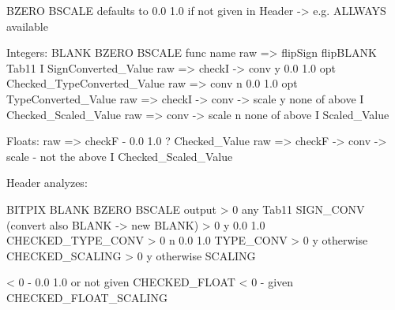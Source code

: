 

BZERO BSCALE defaults to 0.0 1.0 if not given in Header -> e.g. ALLWAYS available
				
Integers:			BLANK	BZERO BSCALE		func name
raw => flipSign		     flipBLANK	Tab11			I SignConverted_Value
raw => checkI -> conv		  y	0.0 1.0  		opt Checked_TypeConverted_Value
raw => conv		  	  n	0.0 1.0  		opt TypeConverted_Value
raw => checkI -> conv -> scale	  y 	none of above		I Checked_Scaled_Value
raw => conv -> scale		  n	none of above		I Scaled_Value


Floats:
raw => checkF			  -	0.0 1.0			? Checked_Value
raw => checkF -> conv -> scale	  -	not the above		I Checked_Scaled_Value



Header analyzes:

BITPIX		BLANK	BZERO BSCALE		output
 > 0		 any	Tab11			SIGN_CONV (convert also BLANK -> new BLANK)
 > 0		  y	0.0 1.0			CHECKED_TYPE_CONV
 > 0		  n	0.0 1.0 		TYPE_CONV
 > 0		  y	otherwise		CHECKED_SCALING
 > 0		  y	otherwise		SCALING

 < 0		  -	0.0 1.0 or not given	CHECKED_FLOAT	
 < 0		  -	given			CHECKED_FLOAT_SCALING	

